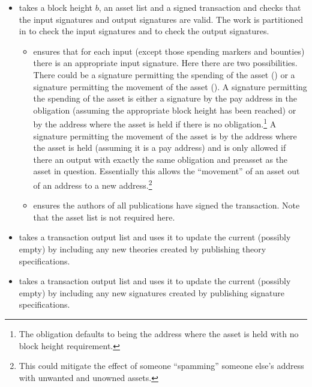 \begin{itemize}
\item {} takes a block height $b$, an asset list
and a signed transaction and checks that the input signatures and output signatures
are valid.
The work is partitioned in {}
to check the input signatures
and {}
to check the output signatures.
\begin{itemize}
\item {} ensures that for each input
(except those spending markers and bounties)
there is an appropriate input signature. Here there are two possibilities.
There could be a signature permitting the spending of the asset ({})
or a signature permitting the movement of the asset ({}).
A signature permitting the spending of the asset is either a signature
by the pay address in the obligation (assuming the appropriate block height has been reached)
or by the address where the asset is held if there is no obligation.\footnote{The obligation {} defaults
to being the address where the asset is held with no block height requirement.}
A signature permitting the movement of the asset is by the address where the asset is held (assuming it is
a pay address) and is only allowed if there an output with exactly the same obligation and preasset
as the asset in question.
Essentially this allows the ``movement'' of an asset out of an address to a new address.\footnote{This could mitigate the effect of someone ``spamming'' someone else's address with unwanted and unowned assets.}
\item {} ensures the authors of all publications
have signed the transaction. Note that the asset list is not required here.
\end{itemize}
\item {} takes a transaction output list
and uses it to update the current (possibly empty) {} by including any new
theories created by publishing theory specifications.
\item {} takes a transaction output list
and uses it to update the current (possibly empty) {} by including any new
signatures created by publishing signature specifications.
\end{itemize}

